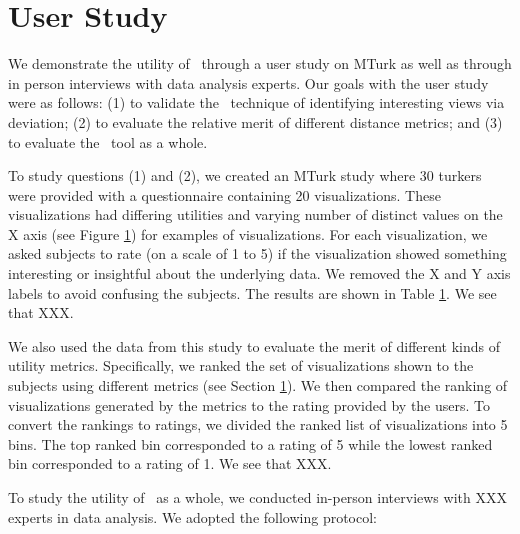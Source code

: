 
\section{User Study}

We demonstrate the utility of \VizRecDB\ through a user study on MTurk as well as
through in person interviews with data analysis experts. 
Our goals with the user study were as follows: (1) to validate the \VizRecDB\
technique of identifying interesting views via deviation; (2) to evaluate the
relative merit of different distance metrics; and (3) to evaluate the \VizRecDB\
tool as a whole.

To study questions (1) and (2), we created an MTurk study where 30 turkers were
provided with a questionnaire containing 20 visualizations. These visualizations
had differing utilities and varying number of distinct values on the X axis
(see Figure \ref{}) for examples of visualizations. For each visualization, we
asked subjects to rate (on a scale of 1 to 5) if the visualization showed
something interesting or insightful about the underlying data. We removed the X
and Y axis labels to avoid confusing the subjects. The results are shown in
Table \ref{}. We see that XXX. 

We also used the data from this study to evaluate the
merit of different kinds of utility metrics. Specifically, we ranked the set of
visualizations shown to the subjects using different metrics (see Section
\ref{}).
We then compared the ranking of visualizations generated by the metrics to the
rating provided by the users. 
To convert the rankings to ratings, we divided the ranked list of visualizations
into 5 bins. The top ranked bin corresponded to a rating of 5 while the lowest
ranked bin corresponded to a rating of 1.
We see that XXX.

To study the utility of \VizRecDB\ as a whole, we conducted in-person interviews
with XXX experts in data analysis. We adopted the following protocol: 


